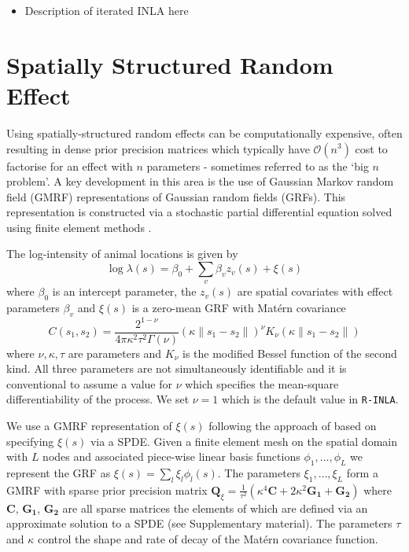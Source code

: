 \documentclass[preprint,12pt]{elsarticle}
\newcommand{\bm}{\boldsymbol}  %
\begin{document}
\begin{itemize}
 \item Description of iterated INLA here
\end{itemize}

\section{Spatially Structured Random Effect}
\label{GMRFexplanation}

Using spatially-structured random effects can be computationally expensive, often resulting in dense prior precision matrices which typically have $\mathcal{O}(n^3)$ cost to factorise for an effect with $n$ parameters - sometimes referred to as the `big $n$ problem'.  A key development in this area is the use of Gaussian Markov random field (GMRF) representations of Gaussian random fields (GRFs).  This representation is constructed via a stochastic partial differential equation solved using finite element methods \citep{lindgren_explicit_2011}.

The log-intensity of animal locations is given by
\begin{equation*}
\log \lambda(s) = \beta_0 + \sum_v \beta_v z_v(s) + \xi(s)
\end{equation*}
where $\beta_0$ is an intercept parameter, the $z_v(s)$ are spatial covariates with effect parameters $\beta_v$ and $\xi(s)$ is a zero-mean GRF with Mat\'ern covariance
\begin{equation}
C(s_1,s_2) = \frac{2^{1-\nu}}{4\pi\kappa^2\tau^2\Gamma(\nu)}(\kappa \|s_1-s_2\|)^{\nu}K_\nu(\kappa \|s_1-s_2\|)
\end{equation}
where \(\nu, \kappa, \tau\) are parameters and \(K_{\nu}\) is the modified Bessel function of the second kind.  All three parameters are not simultaneously identifiable \citep{zhang_inconsistent_2004} and it is conventional to assume a value for $\nu$ which specifies the mean-square differentiability of the process.  We set $\nu = 1$ which is the default value in \texttt{R-INLA}.

We use a GMRF representation of $\xi(s)$ following the approach of \cite{lindgren_explicit_2011} based on specifying $\xi(s)$ via a SPDE.  Given a finite element mesh on the spatial domain with $L$ nodes and associated piece-wise linear basis functions $\phi_1, \ldots, \phi_L$ we represent the GRF as $\xi(s) = \sum_l \xi_l \phi_l(s)$.  The parameters $\xi_1, \ldots, \xi_L$ form a GMRF with sparse prior precision matrix $\bm{Q}_{\xi} = \frac{1}{\tau^2}\left(\kappa^4\bm{C} + 2\kappa^2\bm{G_1} + \bm{G_2}\right)$ where $\bm{C}$, $\bm{G_1}$, $\bm{G_2}$ are all sparse matrices the elements of which are defined via an approximate solution to a SPDE (see Supplementary material). The parameters $\tau$ and $\kappa$ control the shape and rate of decay of the Mat\'ern covariance function. 
\end{document}
